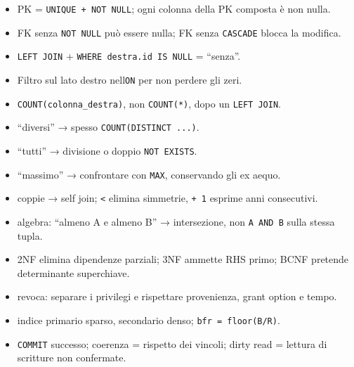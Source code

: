 \documentclass[
  10pt,
  a4paper,
]{article}
\providecommand{\tightlist}{%
  \setlength{\itemsep}{0pt}\setlength{\parskip}{0pt}}
\begin{document}
\begin{itemize}
\tightlist
\item
  PK = \texttt{UNIQUE\ +\ NOT\ NULL}; ogni colonna della PK composta è
  non nulla.
\item
  FK senza \texttt{NOT\ NULL} può essere nulla; FK senza
  \texttt{CASCADE} blocca la modifica.
\item
  \texttt{LEFT\ JOIN} + \texttt{WHERE\ destra.id\ IS\ NULL} = ``senza''.
\item
  Filtro sul lato destro nell\textquotesingle{}\texttt{ON} per non
  perdere gli zeri.
\item
  \texttt{COUNT(colonna\_destra)}, non \texttt{COUNT(*)}, dopo un
  \texttt{LEFT\ JOIN}.
\item
  ``diversi'' → spesso \texttt{COUNT(DISTINCT\ ...)}.
\item
  ``tutti'' → divisione o doppio \texttt{NOT\ EXISTS}.
\item
  ``massimo'' → confrontare con \texttt{MAX}, conservando gli ex aequo.
\item
  coppie → self join; \texttt{\textless{}} elimina simmetrie,
  \texttt{+\ 1} esprime anni consecutivi.
\item
  algebra: ``almeno A e almeno B'' → intersezione, non
  \texttt{A\ AND\ B} sulla stessa tupla.
\item
  2NF elimina dipendenze parziali; 3NF ammette RHS primo; BCNF pretende
  determinante superchiave.
\item
  revoca: separare i privilegi e rispettare provenienza, grant option e
  tempo.
\item
  indice primario sparso, secondario denso; \texttt{bfr\ =\ floor(B/R)}.
\item
  \texttt{COMMIT} successo; coerenza = rispetto dei vincoli; dirty read
  = lettura di scritture non confermate.
\end{itemize}
\end{document}
